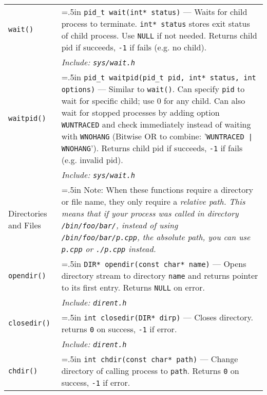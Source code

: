 \documentclass{article}
\newcommand{\indenth}[1][.5]{\hangindent=#1in
                         \hangafter=1 }
\begin{document}
\begin{longtabu}{|p{.9in}|p{6.3in}<{\strut}|}
    \texttt{wait()} & \indenth\texttt{pid\_t wait(int* status)} --- Waits for child process to terminate. \texttt{int* status} stores exit status of child process. Use \texttt{NULL} if not needed. Returns child pid if succeeds, \texttt{-1} if fails (e.g. no child). 
        \\
    & \hspace{.5in}\it Include: \rm\texttt{sys/wait.h}
        \\
    \texttt{waitpid()} & \indenth\texttt{pid\_t waitpid(pid\_t pid, int* status, int options)} --- Similar to \texttt{wait()}. Can specify \texttt{pid} to wait for specific child; use 0 for any child. Can also wait for stopped processes by adding option \texttt{WUNTRACED} and check immediately instead of waiting with \texttt{WNOHANG} (Bitwise OR to combine: '\texttt{WUNTRACED | WNOHANG}'). Returns child pid if succeeds, \texttt{-1} if fails (e.g. invalid pid).
        \\
    & \hspace{.5in}\it Include: \rm\texttt{sys/wait.h}
        \\ \hline
    Directories and Files & \indenth Note: When these functions require a directory or file name, they only require a \itshape relative path\rm. This means that if your process was called in directory \texttt{/bin/foo/bar/}, instead of using \texttt{/bin/foo/bar/p.cpp}, the \itshape absolute path\rm,  you can use \texttt{p.cpp} or \texttt{./p.cpp} instead. \par
        \\ %
    \texttt{opendir()} & \indenth\texttt{DIR* opendir(const char* name)} --- Opens directory stream to directory \texttt{name} and returns pointer to its first entry. Returns \texttt{NULL} on error. 
        \\
    & \hspace{.5in}\it Include: \rm\texttt{dirent.h}
        \\
    \texttt{closedir()} & \indenth\texttt{int closedir(DIR* dirp)} --- Closes  directory. returns \texttt{0} on success, \texttt{-1} if error.
        \\
    & \hspace{.5in}\it Include: \rm\texttt{dirent.h}
        \\ %
    \texttt{chdir()} & \indenth\texttt{int chdir(const char* path)} --- Change directory of calling process to \texttt{path}. Returns \texttt{0} on success, \texttt{-1} if error.
        \\

\end{longtabu}
\end{document}
